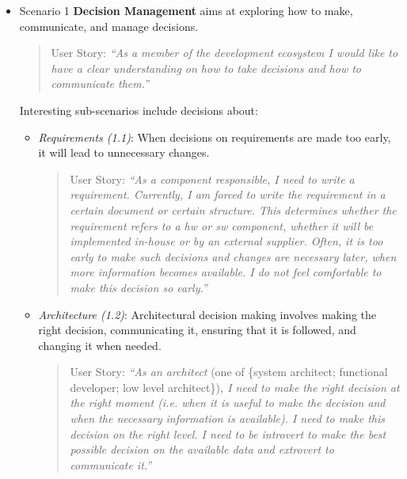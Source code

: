\begin{itemize}
\item Scenario 1 {\bf Decision Management } aims at exploring how to make, communicate, and manage decisions. 

\begin{quote}
{User Story:} \emph{``As a member of the development ecosystem I would like to have a clear understanding on how to take decisions and how to communicate them.''}
\end{quote}


Interesting sub-scenarios include decisions about:

\begin{itemize}
\item  {\em Requirements (1.1)}: When decisions on requirements are made too early, it will lead to unnecessary changes.


\begin{quote}
{User Story:} 
\emph{``As a component responsible, I need to write a requirement. 
Currently, I am forced to write the requirement in a certain document or certain structure. 
This determines whether the requirement refers to a hw or sw component, whether it will be implemented in-house or by an external supplier. 
Often, it is too early to make such decisions and changes are necessary later, when more information becomes available. 
I do not feel comfortable to make this decision so early.''}
\end{quote}

\item {\em Architecture (1.2)}: Architectural decision making involves making the right decision, communicating it, ensuring that it is followed, and changing it when needed. 


\begin{quote}
{User Story:} 
\emph{``As an architect} (one of \{system architect; functional developer; low level architect\})\emph{, I need to make the right decision at the right moment (i.e. when it is useful to make the decision and when the necessary information is available).  
I need to make this decision on the right level. 
I need to be introvert to make the best possible decision on the available data and extrovert to communicate it.''}
\end{quote}


\end{itemize}
\end{itemize}
